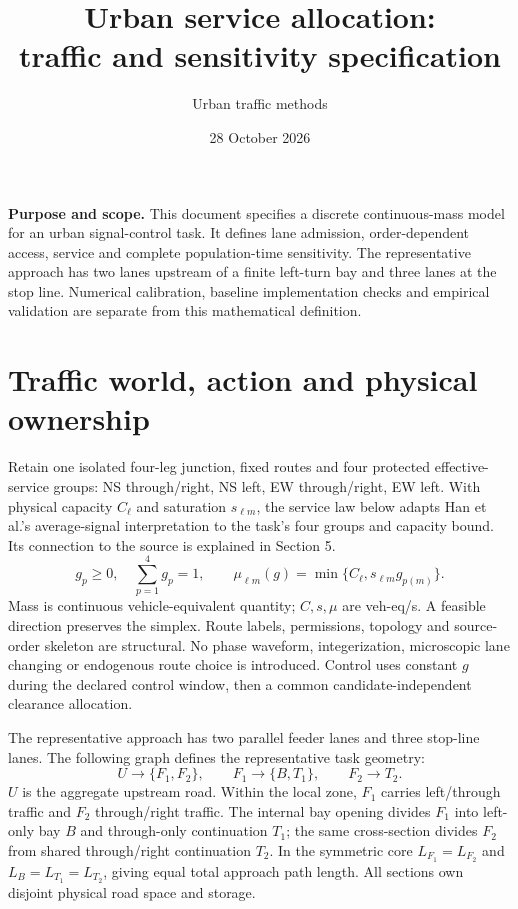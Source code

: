\documentclass[10pt,a4paper]{article}
\title{Urban service allocation:\\traffic and sensitivity specification}
\author{Urban traffic methods}
\date{28 October 2026}
\newcommand{\rev}[1]{{\color{revisionred}#1}}
\begin{document}
\maketitle

\textbf{Purpose and scope.}
This document specifies a discrete continuous-mass model for an urban
signal-control task. It defines lane admission, order-dependent access,
service and complete population-time sensitivity. The representative
approach has two lanes upstream of a finite left-turn bay and three lanes
at the stop line. Numerical calibration, baseline implementation checks
and empirical validation are separate from this mathematical definition.

\section{Traffic world, action and physical ownership}

Retain one isolated four-leg junction, fixed routes and four protected
effective-service groups: NS through/right, NS left, EW through/right,
EW left. With physical capacity $C_\ell$ and saturation $s_{\ell m}$,
\rev{the service law below adapts Han et al.'s average-signal interpretation to the task's four groups and capacity bound.}
Its connection to the source is explained in Section 5.
\begin{equation}
 g_p\geq0,\quad \sum_{p=1}^4g_p=1,\qquad
 \mu_{\ell m}(g)=\min\{C_\ell,s_{\ell m}g_{p(m)}\}.
 \label{eq:action}
\end{equation}
Mass is continuous vehicle-equivalent quantity; $C,s,\mu$ are veh-eq/s.
A feasible direction preserves the simplex. Route labels, permissions,
topology and source-order skeleton are structural. No phase waveform,
integerization, microscopic lane changing or endogenous route choice is
introduced. Control uses constant $g$ during the declared control window,
then a common candidate-independent clearance allocation.

The representative approach has two parallel feeder lanes and three
stop-line lanes.
\rev{The following graph defines the representative task geometry:}
\begin{equation}
 U\longrightarrow\{F_1,F_2\},\qquad
 F_1\longrightarrow\{B,T_1\},\qquad F_2\longrightarrow T_2 .
 \label{eq:geometry}
\end{equation}
$U$ is the aggregate upstream road. Within the local zone, $F_1$ carries
left/through traffic and $F_2$ through/right traffic. The internal bay
opening divides $F_1$ into left-only bay $B$ and through-only continuation
$T_1$; the same cross-section divides $F_2$ from shared through/right
continuation $T_2$. In the symmetric core
$L_{F_1}=L_{F_2}$ and $L_B=L_{T_1}=L_{T_2}$, giving equal total approach
path length. All sections own disjoint physical road space and storage.
\end{document}
